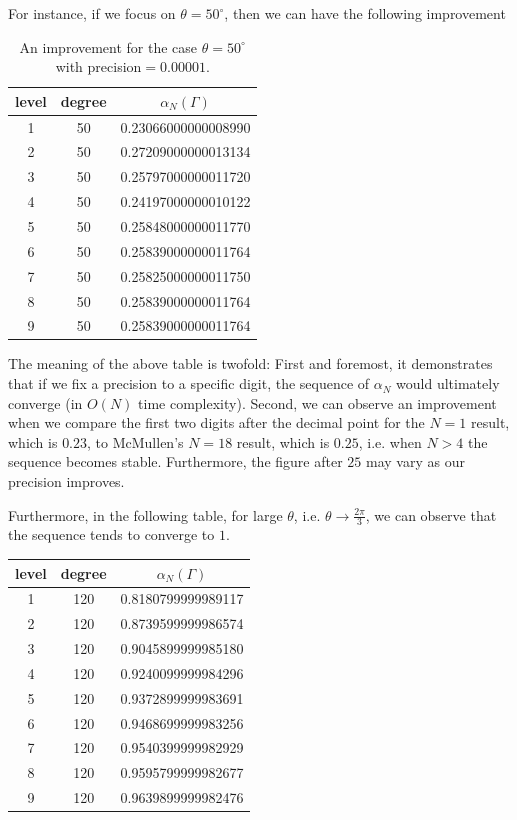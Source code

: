 \documentclass[12pt,oneside]{sfsuthesis}
\theoremstyle{plain} %
\theoremstyle{definition}  %
\theoremstyle{remark}  %
\theoremstyle{plain}
\begin{document}
{For instance, if we focus on $\theta=50^\circ$, then we can have the following improvement
\begin{center}
\begin{table}[h]
\begin{tabular}{ c c c }
\hline
 level & degree & $\alpha_N(\Gamma)$ \\ \hline

 1 & 50 & 0.23066000000008990 \\
 2 & 50 & 0.27209000000013134 \\
 3 & 50 & 0.25797000000011720 \\
 4 & 50 & 0.24197000000010122 \\
 5 & 50 & 0.25848000000011770 \\
 6 & 50 & 0.25839000000011764 \\
 7 & 50 & 0.25825000000011750 \\  
 8 & 50 & 0.25839000000011764 \\  
 9 & 50 & 0.25839000000011764 \\ \hline
 
\end{tabular}
\caption{An improvement for the case $\theta=50^\circ$ with precision$=0.00001$.}
    \label{tab:McMullen1}   
\end{table}
\end{center}

The meaning of the above table is twofold: First and foremost, it demonstrates that if we fix a precision to a specific digit, the sequence of $\alpha_N$ would ultimately converge (in $O(N)$ time complexity). Second, we can observe an improvement when we compare the first two digits after the decimal point for the $N=1$ result, which is $0.23$, to McMullen's $N=18$ result, which is $0.25$, i.e. when $N>4$ the sequence becomes stable. Furthermore, the figure after $25$ may vary as our precision improves.



Furthermore, in the following table, for large $\theta$, i.e. $\theta\to\frac{2\pi}{3}$, we can observe that the sequence tends to converge to $1$.


\begin{center}
\begin{table}[h]
\begin{tabular}{ c c c }
\hline
 level & degree & $\alpha_N(\Gamma)$ \\ \hline

 1 & 120 & 0.8180799999989117 \\
 2 & 120 & 0.8739599999986574 \\
 3 & 120 & 0.9045899999985180 \\
 4 & 120 & 0.9240099999984296 \\
 5 & 120 & 0.9372899999983691 \\
 6 & 120 & 0.9468699999983256 \\
 7 & 120 & 0.9540399999982929 \\  
 8 & 120 & 0.9595799999982677 \\  
 9 & 120 & 0.9639899999982476 \\ \hline
 

\end{tabular}
\end{table}
\end{center}}
\end{document}
